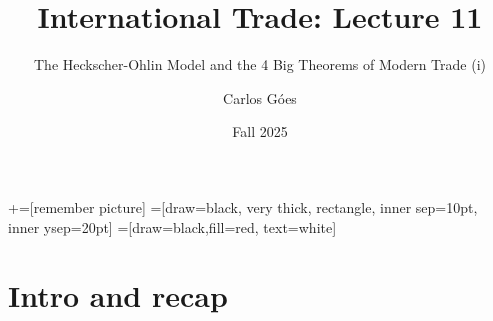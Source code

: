 \documentclass[notes,11pt, aspectratio=169, xcolor=table]{beamer}
\title[]{International Trade: Lecture 11}
\subtitle[]{The Heckscher-Ohlin Model and the 4 Big Theorems of Modern Trade (i)}
\author[Góes]
{Carlos Góes\inst{1}}
\date{Fall 2025}
\institute[GWU]{\inst{1} George Washington University }
\begin{document}
\newcommand\marktopleft[1]{%
    \tikz[overlay,remember picture] 
        \node (marker-#1-a) at (-.3em,.3em) {};%
}
\newcommand\markbottomright[2]{%
    \tikz[overlay,remember picture] 
        \node (marker-#1-b) at (0em,0em) {};%
}
+=[remember picture] 
 =[draw=black, very thick, rectangle, inner sep=10pt, inner ysep=20pt]
 =[draw=black,fill=red, text=white]















\frame{\titlepage}
\addtocounter{framenumber}{-1}




\section{Intro and recap}
\end{document}
